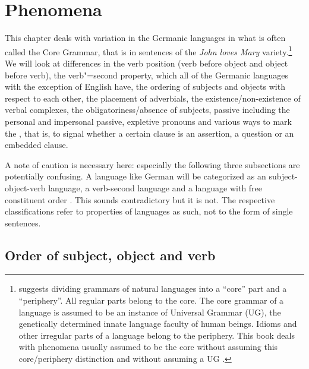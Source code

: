 
\settowidth{}


\chapter{Phenomena}


This chapter deals with variation in the Germanic languages in what is often called the Core
Grammar, that is in sentences of the \emph{John loves Mary} variety.\footnote{%
  \citet[--8]{Chomsky81a} suggests dividing grammars of natural languages into a ``core'' part and a ``periphery''.
All regular parts belong to the core. The core grammar of a language is assumed to be an instance of
Universal Grammar (UG), the genetically determined innate language faculty of human beings. Idioms
and other irregular parts of a language belong to the periphery. This book deals with phenomena
usually assumed to be the core without assuming this core/periphery distinction and without assuming
a UG \citep{MuellerKernigkeit,MuellerCoreGram}.
} We will look at differences in
the verb position (verb before object and object before verb), the verb"=second property, which
all of the Germanic languages with the exception of English have, the ordering of subjects and
objects with respect to each other, the placement of adverbials, the existence/non-existence of
verbal complexes, the obligatoriness/absence of subjects, passive including the personal and
impersonal passive, expletive pronouns and various ways to mark the , that is, to
signal whether a certain clause is an assertion, a question or an embedded clause.

A note of caution is necessary here: especially the following three subsections are potentially
confusing. A language like German will be categorized as an subject-object-verb language, a verb-second language and
a language with free constituent order \citep{Haftka96a}. This sounds contradictory but it is not. The respective
classifications refer to properties of languages as such, not to the form of single sentences.

\section{Order of subject, object and verb}
\label{sec-intro-svo}

